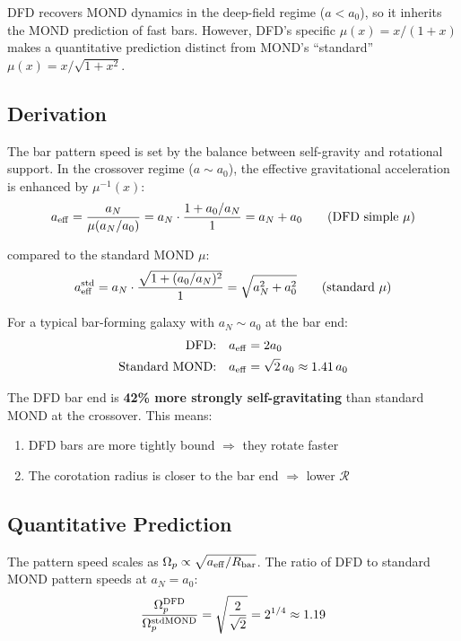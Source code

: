 \documentclass[11pt]{article}
\begin{document}
DFD recovers MOND dynamics in the deep-field regime ($a < a_0$), so it inherits the
MOND prediction of fast bars. However, DFD's specific $\mu(x) = x/(1+x)$ makes a
quantitative prediction distinct from MOND's ``standard'' $\mu(x) = x/\sqrt{1+x^2}$.

\subsection{Derivation}

The bar pattern speed is set by the balance between self-gravity and rotational support.
In the crossover regime ($a \sim a_0$), the effective gravitational acceleration is
enhanced by $\mu^{-1}(x)$:
\begin{equation}
a_{\rm eff} = \frac{a_N}{\mu(a_N/a_0)} = a_N \cdot \frac{1 + a_0/a_N}{1} = a_N + a_0
\qquad\text{(DFD simple } \mu\text{)}
\end{equation}

compared to the standard MOND $\mu$:
\begin{equation}
a_{\rm eff}^{\rm std} = a_N \cdot \frac{\sqrt{1 + (a_0/a_N)^2}}{1} = \sqrt{a_N^2 + a_0^2}
\qquad\text{(standard } \mu\text{)}
\end{equation}

For a typical bar-forming galaxy with $a_N \sim a_0$ at the bar end:
\begin{align}
\text{DFD:} &\quad a_{\rm eff} = 2a_0 \\
\text{Standard MOND:} &\quad a_{\rm eff} = \sqrt{2}\,a_0 \approx 1.41\,a_0
\end{align}

The DFD bar end is \textbf{42\% more strongly self-gravitating} than standard MOND
at the crossover. This means:
\begin{enumerate}
\item DFD bars are more tightly bound $\Rightarrow$ they rotate faster
\item The corotation radius is closer to the bar end $\Rightarrow$ lower $\mathcal{R}$
\end{enumerate}

\subsection{Quantitative Prediction}

The pattern speed scales as $\Omega_p \propto \sqrt{a_{\rm eff}/R_{\rm bar}}$. The
ratio of DFD to standard MOND pattern speeds at $a_N = a_0$:
\begin{equation}
\frac{\Omega_p^{\rm DFD}}{\Omega_p^{\rm stdMOND}} = \sqrt{\frac{2}{\sqrt{2}}} = 2^{1/4} \approx 1.19
\end{equation}
\end{document}
